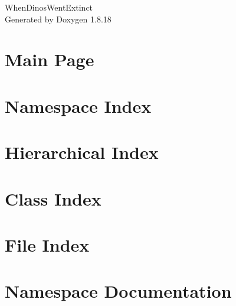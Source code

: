 \let\mypdfximage\pdfximage\def\pdfximage{\immediate\mypdfximage}\documentclass[twoside]{book}
\newcommand{\+}{\discretionary{\mbox{\scriptsize$\hookleftarrow$}}{}{}}
\newcommand{\clearemptydoublepage}{%
  \newpage{\pagestyle{empty}\cleardoublepage}%
}
\begin{document}
\hypersetup{pageanchor=false,
             bookmarksnumbered=true,
             pdfencoding=unicode
            }
\begin{titlepage}
\vspace*{7cm}
\begin{center}%
{\Large When\+Dinos\+Went\+Extinct }\\
\vspace*{1cm}
{\large Generated by Doxygen 1.8.18}\\
\end{center}
\end{titlepage}
\clearemptydoublepage
{}
\tableofcontents
\clearemptydoublepage
{}
\hypersetup{pageanchor=true}

\chapter{Main Page}
\label{index}\hypertarget{index}{}
\chapter{Namespace Index}

\chapter{Hierarchical Index}

\chapter{Class Index}

\chapter{File Index}

\chapter{Namespace Documentation}






\end{document}
